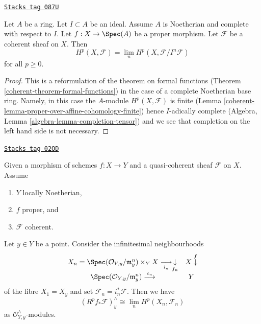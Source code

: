 \begin{lemma}
\label{coherent-lemma-spell-out-theorem-formal-functions}
\href{https://stacks.math.columbia.edu/tag/087U}{\texttt{Stacks tag 087U}}

Let $A$ be a ring. Let $I \subset A$ be an ideal. Assume $A$ is
Noetherian and complete with respect to $I$.
Let $f : X \to \Spec(A)$ be a proper morphism.
Let $\mathcal{F}$ be a coherent sheaf on $X$.
Then
$$
H^p(X, \mathcal{F}) = \lim_n H^p(X, \mathcal{F}/I^n\mathcal{F})
$$
for all $p \geq 0$.
\end{lemma}

\begin{proof}

This is a reformulation of the theorem on formal functions
(Theorem \ref{coherent-theorem-formal-functions}) in the
case of a complete Noetherian base ring. Namely, in this case the
$A$-module $H^p(X, \mathcal{F})$ is finite
(Lemma \ref{coherent-lemma-proper-over-affine-cohomology-finite}) hence
$I$-adically complete (Algebra, Lemma \ref{algebra-lemma-completion-tensor})
and we see that completion on the left hand side is not necessary.
\end{proof}

\begin{lemma}
\label{coherent-lemma-formal-functions-stalk}
\href{https://stacks.math.columbia.edu/tag/02OD}{\texttt{Stacks tag 02OD}}

Given a morphism of schemes $f : X \to Y$ and a quasi-coherent sheaf
$\mathcal{F}$ on $X$. Assume
\begin{enumerate}
\item $Y$ locally Noetherian,
\item $f$ proper, and
\item $\mathcal{F}$ coherent.
\end{enumerate}
Let $y \in Y$ be a point. Consider the infinitesimal neighbourhoods
$$
\begin{array}{cc}X_n =
\Spec(\mathcal{O}_{Y, y}/\mathfrak m_y^n) \times_Y X
\underset{i_n}{\longrightarrow}\underset{f_n}{\downarrow} & X \overset{f}{\downarrow} \\ \Spec(\mathcal{O}_{Y, y}/\mathfrak m_y^n) \overset{c_n}{\longrightarrow} & Y\end{array}
$$
of the fibre $X_1 = X_y$ and set $\mathcal{F}_n = i_n^*\mathcal{F}$.
Then we have
$$
\left(R^pf_*\mathcal{F}\right)_y^\wedge
\cong
\lim_n H^p(X_n, \mathcal{F}_n)
$$
as $\mathcal{O}_{Y, y}^\wedge$-modules.
\end{lemma}

